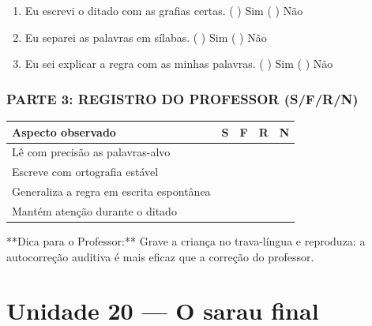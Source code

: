 \begin{exercicio}
\begin{enumerate}[label=\alph*)]
  \item Eu escrevi o ditado com as grafias certas.  \quad ( ) Sim   ( ) Não

  \item Eu separei as palavras em sílabas.  \quad ( ) Sim   ( ) Não

  \item Eu sei explicar a regra com as minhas palavras.  \quad ( ) Sim   ( ) Não

\end{enumerate}

\subsection*{PARTE 3: REGISTRO DO PROFESSOR (S/F/R/N)}

\begin{center}
\renewcommand{\arraystretch}{1.4}
\begin{tabular}{@{}p{9cm}cccc@{}}
\toprule
Aspecto observado & S & F & R & N \\
\midrule
Lê com precisão as palavras-alvo & & & & \\
Escreve com ortografia estável & & & & \\
Generaliza a regra em escrita espontânea & & & & \\
Mantém atenção durante o ditado & & & & \\
\bottomrule\end{tabular}\end{center}

\end{exercicio}

\begin{dica}
**Dica para o Professor:** Grave a criança no trava-língua e reproduza: a autocorreção auditiva é mais eficaz que a correção do professor.
\end{dica}


\chapter{Unidade 20 --- O sarau final}


